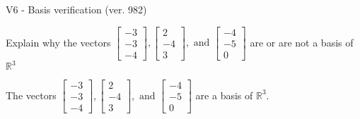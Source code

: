 \begin{exercise}
  \begin{exerciseTitle}V6 - Basis verification (ver. 982)\end{exerciseTitle}
  \begin{exerciseStatement}
    Explain why the vectors \(\left[\begin{array}{r}
-3 \\
-3 \\
-4
\end{array}\right] , \left[\begin{array}{r}
2 \\
-4 \\
3
\end{array}\right] , \text{ and } \left[\begin{array}{r}
-4 \\
-5 \\
0
\end{array}\right]\) are or are not a basis of \(\mathbb{R}^3\)	


  \end{exerciseStatement}
  \begin{exerciseAnswer}
   The vectors \(\left[\begin{array}{r}
-3 \\
-3 \\
-4
\end{array}\right] , \left[\begin{array}{r}
2 \\
-4 \\
3
\end{array}\right] , \text{ and } \left[\begin{array}{r}
-4 \\
-5 \\
0
\end{array}\right]\) 
  	 are  a basis of \(\mathbb{R}^3\).
  


  \end{exerciseAnswer}
\end{exercise}